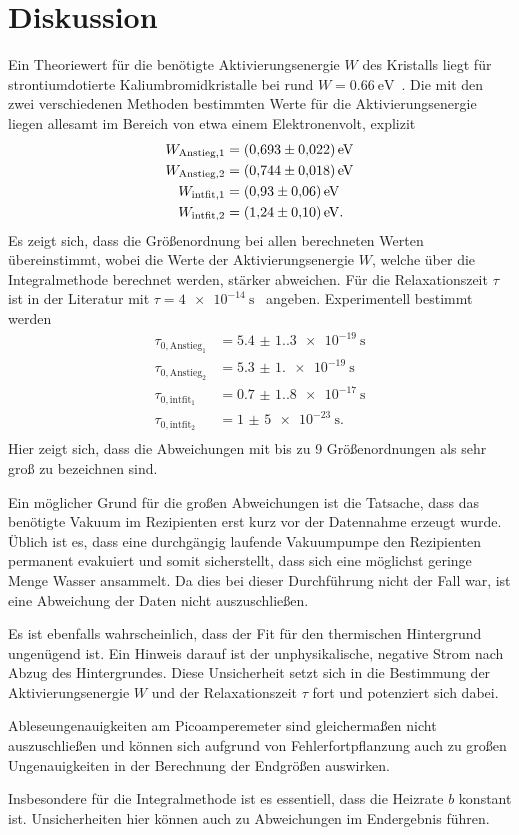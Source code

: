 \section{Diskussion}
\label{sec:Diskussion}
Ein Theoriewert für die benötigte Aktivierungsenergie $W$ des Kristalls liegt für strontiumdotierte Kaliumbromidkristalle bei rund $W=\qty{0.66}{\electronvolt}$~\cite{v48_litwert_W}. Die mit 
den zwei verschiedenen Methoden bestimmten Werte für die Aktivierungsenergie liegen allesamt im Bereich von etwa einem Elektronenvolt, explizit
\begin{align*}
    W_{\text{Anstieg}, 1} &= \qty{0.693+-0.022}{\electronvolt} \\
    W_{\text{Anstieg}, 2} &= \qty{0.744+-0.018}{\electronvolt} \\
    W_{\text{intfit}, 1} &= \qty{0.93+-0.06}{\electronvolt} \\    
    W_{\text{intfit}, 2} &= \qty{1.24+-0.10}{\electronvolt}. \\
\end{align*}
Es zeigt sich, dass die Größenordnung bei allen berechneten Werten übereinstimmt, wobei die Werte der Aktivierungsenergie $W$, welche über die Integralmethode 
berechnet werden, stärker abweichen.
Für die Relaxationszeit $\tau$ ist in der Literatur mit $\tau=\qty{4e-14}{\second}$~\cite{v48_litwert_W} angeben. Experimentell bestimmt werden 
\begin{align*}
    \tau_{0, \text{Anstieg}_1} &= \qty{5.4(1.3)e-19}{\second} \\
    \tau_{0, \text{Anstieg}_2} &= \qty{5.3(1.0)e-19}{\second} \\
    \tau_{0, \text{intfit}_1} &= \qty{0.7(1.8)e-17}{\second} \\
    \tau_{0, \text{intfit}_2} &= \qty{1(5)e-23}{\second}. \\
\end{align*}
Hier zeigt sich, dass die Abweichungen mit bis zu 9 Größenordnungen als sehr groß zu bezeichnen sind.

Ein möglicher Grund für die großen Abweichungen ist die Tatsache, dass das benötigte Vakuum im Rezipienten erst kurz vor der Datennahme erzeugt wurde. Üblich 
ist es, dass eine durchgängig laufende Vakuumpumpe den Rezipienten permanent evakuiert und somit sicherstellt, dass sich eine möglichst geringe Menge Wasser
ansammelt. Da dies bei dieser Durchführung nicht der Fall war, ist eine Abweichung der Daten nicht auszuschließen.

Es ist ebenfalls wahrscheinlich, dass der Fit für den thermischen Hintergrund ungenügend ist. Ein Hinweis darauf ist der unphysikalische, negative Strom nach
Abzug des Hintergrundes. Diese Unsicherheit setzt sich in die Bestimmung der Aktivierungsenergie $W$ und der Relaxationszeit $\tau$ fort und potenziert sich dabei.

Ableseungenauigkeiten am Picoamperemeter sind gleichermaßen nicht auszuschließen und können sich aufgrund von Fehlerfortpflanzung auch zu großen Ungenauigkeiten
in der Berechnung der Endgrößen auswirken.

Insbesondere für die Integralmethode ist es essentiell, dass die Heizrate $b$ konstant ist. Unsicherheiten hier können auch zu Abweichungen im Endergebnis führen.